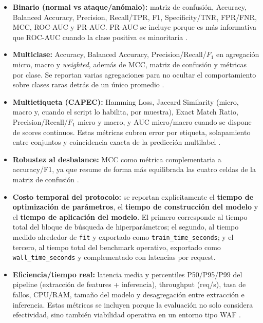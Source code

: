 \documentclass[12pt,oneside]{report}
\begin{document}
\begin{itemize}[leftmargin=*]
  \item \textbf{Binario (normal vs ataque/anómalo):} matriz de confusión, Accuracy, Balanced Accuracy, Precision, Recall/TPR, F1, Specificity/TNR, FPR/FNR, MCC, ROC-AUC y PR-AUC. PR-AUC se incluye porque es más informativa que ROC-AUC cuando la clase positiva es minoritaria \cite{saito_pr_auc}.
  \item \textbf{Multiclase:} Accuracy, Balanced Accuracy, Precision/Recall/$F_1$ en agregación micro, macro y \textit{weighted}, además de MCC, matriz de confusión y métricas por clase. Se reportan varias agregaciones para no ocultar el comportamiento sobre clases raras detrás de un único promedio \cite{tsoumakas_multilabel_overview,zhou_2024}.
  \item \textbf{Multietiqueta (CAPEC):} Hamming Loss, Jaccard Similarity (micro, macro y, cuando el script lo habilita, por muestra), Exact Match Ratio, Precision/Recall/$F_1$ micro y macro, y AUC micro/macro cuando se dispone de scores continuos. Estas métricas cubren error por etiqueta, solapamiento entre conjuntos y coincidencia exacta de la predicción multilabel \cite{srbh_paper,tsoumakas_multilabel_overview}.
  \item \textbf{Robustez al desbalance:} MCC como métrica complementaria a accuracy/F1, ya que resume de forma más equilibrada las cuatro celdas de la matriz de confusión \cite{chicco_mcc}.
  \item \textbf{Costo temporal del protocolo:} se reportan explícitamente el \textbf{tiempo de optimización de parámetros}, el \textbf{tiempo de construcción del modelo} y el \textbf{tiempo de aplicación del modelo}. El primero corresponde al tiempo total del bloque de búsqueda de hiperparámetros; el segundo, al tiempo medido alrededor de \texttt{fit} y exportado como \texttt{train\_time\_seconds}; y el tercero, al tiempo total del benchmark operativo, exportado como \texttt{wall\_time\_seconds} y complementado con latencias por request.
  \item \textbf{Eficiencia/tiempo real:} latencia media y percentiles P50/P95/P99 del pipeline (extracción de features + inferencia), throughput (req/s), tasa de fallos, CPU/RAM, tamaño del modelo y desagregación entre extracción e inferencia. Estas métricas se incluyen porque la evaluación no solo considera efectividad, sino también viabilidad operativa en un entorno tipo WAF \cite{ocswaf_zenodo}.
\end{itemize}
\end{document}
